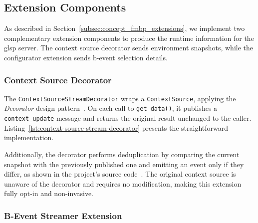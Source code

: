 

\subsection{Extension Components}
\label{subsec:impl_fmbp_components}
 
As described in Section~\ref{subsec:concept_fmbp_extensions}, we implement two complementary extension components to produce the runtime information for the \gls{glsp} server.
The context source decorator sends environment snapshots, while the configurator extension sends b-event selection details.

\subsubsection{Context Source Decorator}
\label{subsubsec:impl_fmbp_components_context}



The \texttt{ContextSourceStreamDecorator} wraps a \texttt{ContextSource}, applying the \textit{Decorator} design pattern~\cite{gamma_design_1993}.
On each call to \texttt{get\_data()}, it publishes a \texttt{context\_update} message and returns the original result unchanged to the caller.
Listing~\ref{lst:context-source-stream-decorator} presents the straightforward implementation.
 
Additionally, the decorator performs deduplication by comparing the current snapshot with the previously published one and emitting an event only if they differ, as shown in the project's source code~\cite{ruider_xxnicksdaxxma-nick-ruider_2026}.
The original context source is unaware of the decorator and requires no modification, making this extension fully opt-in and non-invasive.

\subsubsection{B-Event Streamer Extension}
\label{subsubsec:impl_fmbp_components_event_streamer}
 
